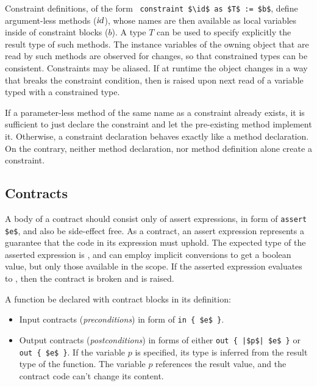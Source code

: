Constraint definitions, of the form ~\lstinline!constraint $\id$ as $T$ := $b$!, define argument-less methods ($\mbox{\sl id}$), whose names are then available as local variables inside of constraint blocks ($b$). A type $T$ can be used to specify explicitly the result type of such methods. The instance variables of the owning object that are read by such methods are observed for changes, so that constrained types can be consistent. Constraints may be aliased. If at runtime the object changes in a way that breaks the constraint condition, then  is raised upon next read of a variable typed with a constrained type. 

If a parameter-less method of the same name as a constraint already exists, it is sufficient to just declare the constraint and let the pre-existing method implement it. Otherwise, a constraint declaration behaves exactly like a method declaration. On the contrary, neither method declaration, nor method definition alone create a constraint. 





\subsection{Contracts}

A body of a contract should consist only of assert expressions, in form of \lstinline!assert $e$!, and also be side-effect free. As a contract, an assert expression represents a guarantee that the code in its expression must uphold. The expected type of the asserted expression is , and can employ implicit conversions to get a boolean value, but only those available in the scope. If the asserted expression evaluates to , then the contract is broken and  is raised. 

A function be declared with contract blocks in its definition:
\begin{itemize}
  \item Input contracts ({\em preconditions}) in form of \lstinline!in { $e$ }!.
  \item Output contracts ({\em postconditions}) in forms of either \lstinline!out { |$p$| $e$ }! or \lstinline!out { $e$ }!. If the variable $p$ is specified, its type is inferred from the result type of the function. The variable $p$ references the result value, and the contract code can't change its content. 
\end{itemize}


